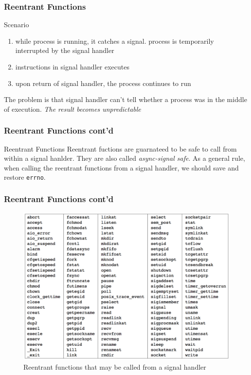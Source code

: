 \documentclass[newPxFont,sthlmFooter,nooffset]{beamer}
\begin{document}
\begin{frame}[fragile,t]
  \frametitle{Reentrant Functions}

Scenario
\begin{enumerate}
\item <1-> while process is running, it catches a signal. process is temporarily interrupted by the signal handler
\item <2-> instructions in signal handler executes
\item <3-> upon return of signal handler, the process continues to run
\end{enumerate}

 {The problem is that signal handler can't tell whether a process was in the middle of execution. \textit{The result becomes unpredictable}}
\end{frame}


\begin{frame}[fragile]
  \frametitle{Reentrant Functions cont'd}
\begin{block}{Reentrant Functions}
Reentrant fuctions are guarnateed to be safe to call from within a signal hanlder.   They are also called \textit{async-signal safe}. As a general rule, when calling the reentrant  functions from a signal handler, we should save and restore \texttt{errno}.
\end{block}
\end{frame}

\begin{frame}
  \frametitle{Reentrant Functions cont'd}  
  \begin{figure}[h]
    \centering
    \includegraphics[height=0.87\textheight]{figure/fig10-4_reentrant.png}
    \caption{Reentrant functions that may be called from a signal handler}
  \end{figure}
\end{frame}
\end{document}
